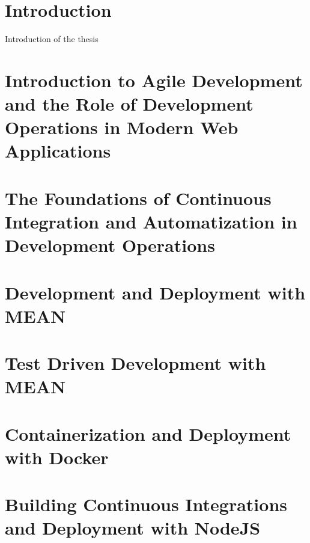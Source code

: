 \section{Introduction}
Introduction of the thesis

\newpage

\section{Introduction to Agile Development and the Role of Development Operations in Modern Web Applications
}
\label{section:Introduction to Agile Development and the Role of Development Operations in Modern Web Applications
}
\newpage

\section{The Foundations of Continuous Integration and Automatization in Development Operations
}
\label{section:The Foundations of Continuous Integration and Automatization in Development Operations
}
\newpage

\section{Development and Deployment with MEAN
}
\label{section:Development and Deployment with MEAN
}
\newpage

\section{Test Driven Development with MEAN
}
\label{section:Test Driven Development with MEAN
}
\newpage

\section{Containerization and Deployment with Docker
}
\label{section:Containerization and Deployment with Docker
}
\newpage

\section{Building Continuous Integrations and Deployment with NodeJS
}
\label{section:Building Continuous Integrations and Deployment with NodeJS
}
\newpage





